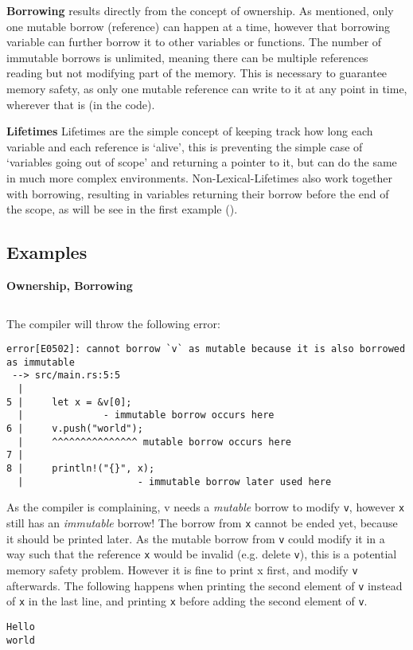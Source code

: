 \textbf{Borrowing}\label{sec:borrowing}
results directly from the concept of ownership. As mentioned, only one mutable
borrow (reference) can happen at a time, however that borrowing variable can
further borrow it to other variables or functions. The number of immutable
borrows is unlimited, meaning there can be multiple references reading but not
modifying part of the memory. This is necessary to guarantee memory safety, as
only one mutable reference can write to it at any point in time, wherever that
is (in the code).

\textbf{Lifetimes}\label{sec:lifetimes}
Lifetimes are the simple concept of keeping track how long each variable and
each reference is `alive', this is preventing the simple case of `variables
going out of scope' and returning a pointer to it, but can do the same in much
more complex environments. Non-Lexical-Lifetimes also work together with
borrowing, resulting in variables returning their borrow before the end of the
scope, as will be see in the first example ().

\newpage
\subsection{Examples}\label{sec:examples}

\textbf{Ownership, Borrowing}

\inputminted[linenos,fontsize=\small]{Rust}{code/code_ownership.rs}

The compiler will throw the following error:
{\small
\begin{verbatim}
error[E0502]: cannot borrow `v` as mutable because it is also borrowed as immutable
 --> src/main.rs:5:5
  |
5 |     let x = &v[0];
  |              - immutable borrow occurs here
6 |     v.push("world");
  |     ^^^^^^^^^^^^^^^ mutable borrow occurs here
7 |
8 |     println!("{}", x);
  |                    - immutable borrow later used here
\end{verbatim}}

As the compiler is complaining, v needs a {\em mutable} borrow to modify
\verb|v|, however \verb|x| still has an {\em immutable} borrow! The borrow from
\verb|x| cannot be ended yet, because it should be printed later. As the mutable
borrow from \verb|v| could modify it in a way such that the reference \verb|x|
would be invalid (e.g. delete \verb|v|), this is a potential memory safety problem.
However it is fine to print x first, and modify \verb|v| afterwards. The
following happens when printing the second element of \verb|v| instead of \verb|x|
in the last line, and printing \verb|x| before adding the second element of \verb|v|.
{\small
\begin{verbatim}
Hello
world
\end{verbatim}}

